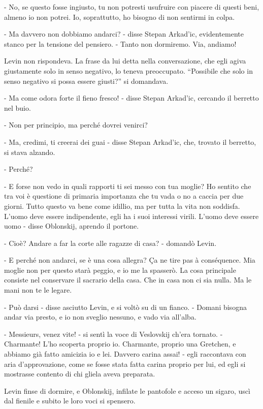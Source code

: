 - No, se questo fosse ingiusto, tu non potresti usufruire con piacere di questi beni, almeno io non potrei. Io, soprattutto, ho bisogno di non sentirmi in colpa. 

- Ma davvero non dobbiamo andarci? - disse Stepan Arkad'ic, evidentemente stanco per la tensione del pensiero. - Tanto non dormiremo. Via, andiamo! 

Levin non rispondeva. La frase da lui detta nella conversazione, che egli agiva giustamente solo in senso negativo, lo teneva preoccupato. ``Possibile che solo in senso negativo si possa essere giusti?'' si domandava. 

- Ma come odora forte il fieno fresco! - disse Stepan Arkad'ic, cercando il berretto nel buio. 

- Non per principio, ma perché dovrei venirci? 

- Ma, credimi, ti creerai dei guai - disse Stepan Arkad'ic, che, trovato il berretto, si stava alzando. 

- Perché? 

- E forse non vedo in quali rapporti ti sei messo con tua moglie? Ho sentito che tra voi è questione di primaria importanza che tu vada o no a caccia per due giorni. Tutto questo va bene come idillio, ma per tutta la vita non soddisfa. L'uomo deve essere indipendente, egli ha i suoi interessi virili. L'uomo deve essere uomo - disse Oblonskij, aprendo il portone. 

- Cioè? Andare a far la corte alle ragazze di casa? - domandò Levin. 

- E perché non andarci, se è una cosa allegra? Ça ne tire pas à conséquence. Mia moglie non per questo starà peggio, e io me la spasserò. La cosa principale consiste nel conservare il sacrario della casa. Che in casa non ci sia nulla. Ma le mani non te le legare. 

- Può darsi - disse asciutto Levin, e si voltò su di un fianco. - Domani bisogna andar via presto, e io non sveglio nessuno, e vado via all'alba. 

- Messieurs, venez vite! - si sentì la voce di Veslovskij ch'era tornato. - Charmante! L'ho scoperta proprio io. Charmante, proprio una Gretchen, e abbiamo già fatto amicizia io e lei. Davvero carina assai! - egli raccontava con aria d'approvazione, come se fosse stata fatta carina proprio per lui, ed egli si mostrasse contento di chi gliela aveva preparata. 

Levin finse di dormire, e Oblonskij, infilate le pantofole e acceso un sigaro, uscì dal fienile e subito le loro voci si spensero. 

